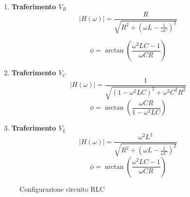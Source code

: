 \documentclass[letterpaper,12pt]{article}
\begin{document}
\begin{enumerate}
    \item \textbf{Traferimento $V_R$} 
        \begin{equation}
            \label{eq:Modulo RLC (resistenza)}
            |H(\omega)| = \frac{R}{\sqrt{R^2 + (\omega L - \frac{1}{\omega C})^2}}  
        \end{equation} 

        \begin{equation}
            \label{eq:Fase RLC (resistenza)}
            \phi = \arctan(\frac{\omega^2LC -1 }{\omega CR})
        \end{equation}
        
     \item \textbf{Traferimento $V_C$} 
     \begin{equation}
            \label{eq:Modulo RLC (capacita)}
            |H(\omega)| = \frac{1}{\sqrt{(1-\omega^2LC)^2 + \omega^2C^2R^2}}
        \end{equation}
    \begin{equation}
            \label{eq:Fase RLC (capacita)}
            \phi = \arctan(\frac{\omega CR}{1 - \omega^2 LC})
        \end{equation}
    
     \item \textbf{Traferimento $V_L$}
     \begin{equation}
            \label{eq:Modulo RLC (induttanza)}
            |H(\omega)| = \frac{\omega^2 L^2}{\sqrt{R^2 + (\omega L - \frac{1}{\omega C})^2}}
        \end{equation}
    \begin{equation}
            \label{eq:Fase RLC (induttanza)}
            \phi = \arctan(\frac{\omega^2LC -1 }{\omega CR})
        \end{equation}
\end{enumerate}
\begin{figure}[h!]
    \centering
    \caption{Configurazione circuito RLC}
    \label{fig:configRLC}
\end{figure}
\end{document}
